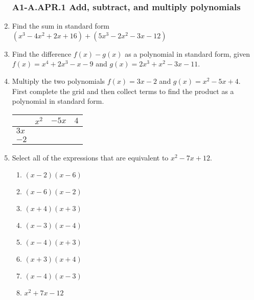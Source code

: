 \documentclass[12pt, twoside]{article}
\begin{document}
\begin{enumerate}
\newpage
\subsubsection*{A1-A.APR.1 Add, subtract, and multiply polynomials}

\item Find the sum in standard form $(x^3-4x^2+2x+16)+(5x^3-2x^2-3x-12)$ \vspace{2cm}

\item Find the difference $f(x)-g(x)$ as a polynomial in standard form, given \\[0.25cm]
    $f(x)=x^4+2x^3-x-9$ and $g(x)=2x^3+x^2-3x-11$. \vspace{4cm}

\item Multiply the two polynomials $f(x)=3x-2$ and $g(x)=x^2-5x+4$. First complete the grid and then collect terms to find the product as a polynomial in standard form. \\[0.25cm]
\begin{tabular}{|p{1cm}|p{3cm}|p{3cm}|p{3cm}|}
    \hline
     & $x^2$ & $-5x$ & $4$ \\
    \hline
    $3x$ &  & & \\[0.5cm]
    \hline
    $-2$ &  & & \\[0.5cm]
    \hline
\end{tabular} \vspace{4cm}

\item Select all of the expressions that are equivalent to $x^2-7x+12$.
    \begin{multicols}{2}
    \begin{enumerate}
        \item $(x-2)(x-6)$
        \item $(x-6)(x-2)$ 
        \item $(x+4)(x+3)$ 
        \item $(x-3)(x-4)$ 
        \item $(x-4)(x+3)$
        \item $(x+3)(x+4)$ 
        \item $(x-4)(x-3)$
        \item $x^2+7x-12$
    \end{enumerate} 
    \end{multicols}
    \vspace{0.25cm}

\newpage

\end{enumerate}
\end{document}
